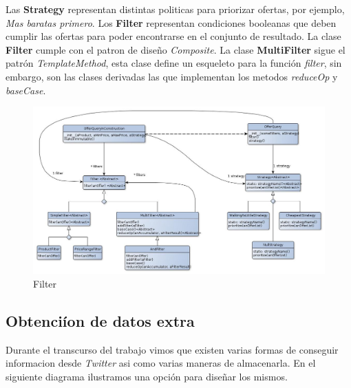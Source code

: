 \documentclass[10pt, a4paper]{article}
\begin{document}
\begin{landscape}
Las \textbf{Strategy} representan distintas politicas para priorizar ofertas, por ejemplo, \emph{Mas baratas primero}. Los \textbf{Filter} representan condiciones booleanas que deben cumplir las ofertas para poder encontrarse en el conjunto de resultado. La clase \textbf{Filter} cumple con el patron de diseño \emph{Composite}. La clase \textbf{MultiFilter} sigue el patrón \emph{TemplateMethod}, esta clase define un esqueleto para la función \emph{filter}, sin embargo, son las clases derivadas las que implementan los metodos \emph{reduceOp} y \emph{baseCase}.

\begin{figure}[H]
\centering
\includegraphics[scale=0.6]{graphics/filter_class.jpg}
\caption{Filter}
\end{figure}

\end{landscape}
\newpage
\subsection{Obtenci\'ion de datos extra}
Durante el transcurso del trabajo vimos que existen varias formas de conseguir informacion desde \emph{Twitter} asi como varias maneras de almacenarla. En el siguiente diagrama ilustramos una opci\'on para diseñar los mismos.
\end{document}
